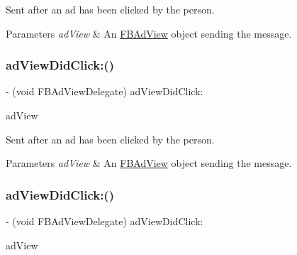 Sent after an ad has been clicked by the person.


\begin{DoxyParams}{Parameters}
{\em ad\+View} & An \hyperlink{interfaceFBAdView}{F\+B\+Ad\+View} object sending the message. \\
\hline
\end{DoxyParams}
\mbox{\label{protocolFBAdViewDelegate_01-p_a7842ffc41d5df660da7238e182ff634a}} 
\subsubsection{\texorpdfstring{ad\+View\+Did\+Click\+:()}{adViewDidClick:()}\hspace{0.1cm}{\footnotesize\ttfamily [3/5]}}
{\footnotesize\ttfamily -\/ (void F\+B\+Ad\+View\+Delegate) ad\+View\+Did\+Click\+: \begin{DoxyParamCaption}\item[{(\hyperlink{interfaceFBAdView}{F\+B\+Ad\+View} $\ast$)}]{ad\+View }\end{DoxyParamCaption}\hspace{0.3cm}{\ttfamily [optional]}}

Sent after an ad has been clicked by the person.


\begin{DoxyParams}{Parameters}
{\em ad\+View} & An \hyperlink{interfaceFBAdView}{F\+B\+Ad\+View} object sending the message. \\
\hline
\end{DoxyParams}
\mbox{\label{protocolFBAdViewDelegate_01-p_a7842ffc41d5df660da7238e182ff634a}} 
\subsubsection{\texorpdfstring{ad\+View\+Did\+Click\+:()}{adViewDidClick:()}\hspace{0.1cm}{\footnotesize\ttfamily [4/5]}}
{\footnotesize\ttfamily -\/ (void F\+B\+Ad\+View\+Delegate) ad\+View\+Did\+Click\+: \begin{DoxyParamCaption}\item[{(\hyperlink{interfaceFBAdView}{F\+B\+Ad\+View} $\ast$)}]{ad\+View }\end{DoxyParamCaption}\hspace{0.3cm}{\ttfamily [optional]}}


